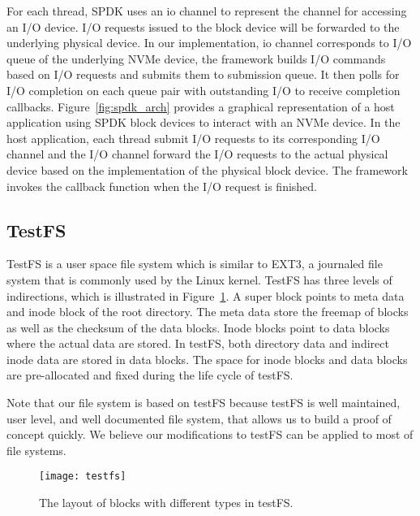 For each thread, SPDK uses an io channel to represent the channel for accessing an 
I/O device. I/O requests issued to the block device will be forwarded to the underlying
physical device. In our implementation, io channel corresponds to I/O queue 
of the underlying NVMe device, the framework builds I/O commands based on I/O 
requests and submits them to submission queue. It then polls for I/O completion
on each queue pair with outstanding I/O to receive completion callbacks.  
Figure~\ref{fig:spdk_arch} provides a graphical
representation of a host application using SPDK block devices to interact with
an NVMe device. In the host application, each thread submit I/O requests to its
corresponding I/O channel and the I/O channel forward the I/O requests to the 
actual physical device based on the implementation of the physical block device.
The framework invokes the callback function when the I/O request is finished.

\subsection{TestFS}

TestFS\cite{testfs} is a user space file system which is similar to EXT3, a
journaled file system that is commonly used by the Linux kernel. TestFS
has three levels of indirections, which is illustrated in Figure~\ref{fig:testfs}.
A super block points to meta data and inode block of the root directory. 
The meta data store the freemap of blocks as well as the checksum of the data blocks.
Inode blocks point to data blocks where the actual data are stored. In testFS, both 
directory data and indirect inode data are stored in data blocks. The
space for inode blocks and data blocks are pre-allocated and fixed during the
life cycle of testFS.

Note that our file system is based on testFS because testFS is well maintained, user
level, and well documented file system, that allows us to build a proof of concept
quickly. We believe our modifications to testFS can be applied to most of file systems.

\begin{figure}[h!]
  \centering
  \texttt{[image: testfs]}
  \caption{The layout of blocks with different types in testFS.}
  \label{fig:testfs}
\end{figure}
